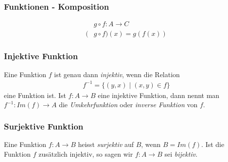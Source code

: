\subsubsection{Funktionen - Komposition}%
\label{ssub:funktionen_koposition}
\begin{minipage}{0.9\linewidth}
\begin{align*}
 &g\circ f:A\to C\\
 (&g\circ f)(x)=g(f(x))
\end{align*}
\end{minipage}

\begin{minipage}[t]{0.45\linewidth}
\subsubsection{Injektive Funktion}%
\label{ssub:injektive_funktion}
Eine Funktion $f$ ist genau dann \textit{injektiv}, wenn die Relation
    \begin{align*}
        f^{-1}=\{(y,x)\mid (x,y)\in f\}
    \end{align*}
    eine Funktion ist. Ist $f:A\to B$ eine injektive Funktion, dann nennt man $f^{-1}:Im(f)\to A$ die \textit{Umkehrfunktion} oder \textit{inverse Funktion} von $f$.
\end{minipage}
\hfill
\begin{minipage}[t]{0.45\linewidth}
\subsubsection{Surjektive Funktion}%
\label{ssub:injektive_funktion}
Eine Funktion $f:A\to B$ heisst \textit{surjektiv} auf $B$, wenn $B=Im(f)$. Ist die Funktion $f$ zusätzlich injektiv, so sagen wir $f:A\to B$ sei \textit{bijektiv}.	
\end{minipage}

